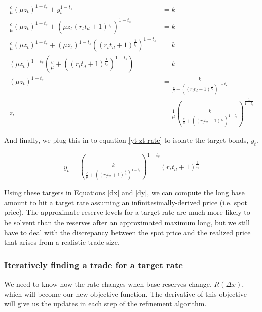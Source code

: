 \begin{equation}
\begin{aligned}
\tfrac{c}{\mu} (\mu z_{t})^{1 - t_{s}} + y_{t}^{1 - t_{s}} &= k \\
\tfrac{c}{\mu} (\mu z_{t})^{1 - t_{s}} + \left( \mu z_{t} \left( r_{t}t_{d}+1 \right)^{\tfrac{1}{t_{s}}} \right)^{1 - t_{s}} &= k \\
\tfrac{c}{\mu} (\mu z_{t})^{1 - t_{s}} + \left( \mu z_{t} \right)^{1-t_{s}} \left( \left( r_{t}t_{d}+1 \right)^{\tfrac{1}{t_{s}}} \right)^{1 - t_{s}} &= k \\
(\mu z_{t})^{1 - t_{s}} \left( \tfrac{c}{\mu} +  \left( (r_{t} t_{d}+1)^{\tfrac{1}{t_{s}}} \right)^{1-t_{s}} \right) &= k \\
(\mu z_{t})^{1 - t_{s}} &=  \tfrac{k}{ \tfrac{c}{\mu} + \left( (r_{t} t_{d}+1)^{\tfrac{1}{t_{s}}} \right)^{1-t_{s}}} \\
z_{t} &= \tfrac{1}{\mu} \left( \tfrac{k}{ \tfrac{c}{\mu} + \left( (r_{t} t_{d}+1)^{\tfrac{1}{t_{s}}} \right)^{1-t_{s}}} \right)^{\tfrac{1}{1-t_{s}}}
\end{aligned}
\end{equation}

And finally, we plug this in to equation \eqref{yt-zt-rate} to isolate the target bonds, $y_{t}$.

\begin{equation}
y_{t} = \left( \tfrac{k}{ \tfrac{c}{\mu} +  \left( \left( r_{t} t_{d} + 1 \right)^{\tfrac{1}{t_{s}}} \right)^{1-t_{s}}} \right)^{1-t_{s}} \left( r_{t} t_{d} + 1 \right)^{\tfrac{1}{t_{s}}}
\end{equation}

Using these targets in Equations \eqref{dx} and \eqref{dy}, we can compute the long base amount to hit a target rate assuming an infinitesimally-derived price (i.e. spot price).
The approximate reserve levels for a target rate are much more likely to be solvent than the reserves after an approximated maximum long, but we still have to deal with the discrepancy between the spot price and the realized price that arises from a realistic trade size.

\subsubsection{Iteratively finding a trade for a target rate}

We need to know how the rate changes when base reserves change, $R(\Delta x)$, which will become our new objective function.
The derivative of this objective will give us the updates in each step of the refinement algorithm.

